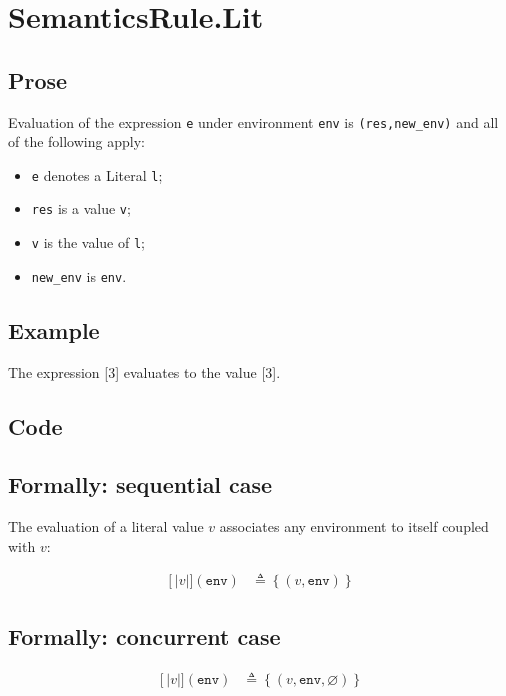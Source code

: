 \documentclass{book}
\newcommand\llbracket{[|}
\newcommand\rrbracket{|]}
\newcommand\interp[1]{\left\llbracket #1 \right\rrbracket}
\begin{document}
\section{SemanticsRule.Lit \label{sec:SemanticsRule.Lit}}

  \subsection{Prose}
  Evaluation of the expression \texttt{e} under environment \texttt{env} is
  \texttt{(res,new\_env)} and all of the following apply:
  \begin{itemize}
  \item \texttt{e} denotes a Literal \texttt{l};
  \item \texttt{res} is a value \texttt{v};
  \item \texttt{v} is the value of \texttt{l};
  \item \texttt{new\_env} is \texttt{env}.
  \end{itemize}

  \subsection{Example}
  The expression [3] evaluates to the value [3].

  \subsection{Code}

  \subsection{Formally: sequential case}
  The evaluation of a literal value $v$ associates any environment to itself
  coupled with $v$: 

  \begin{align}
  \interp{v}(\texttt{env}) & \triangleq \left\{ (v, \texttt{env}) \right\}
  \label{eq:sem-seq-lit}
  \end{align}

  \subsection{Formally: concurrent case}
  \begin{align}
  \interp{v}(\texttt{env}) & \triangleq \left\{ (v, \texttt{env}, \varnothing) \right\}
  \label{eq:sem-conc-lit}
  \end{align}
\end{document}

